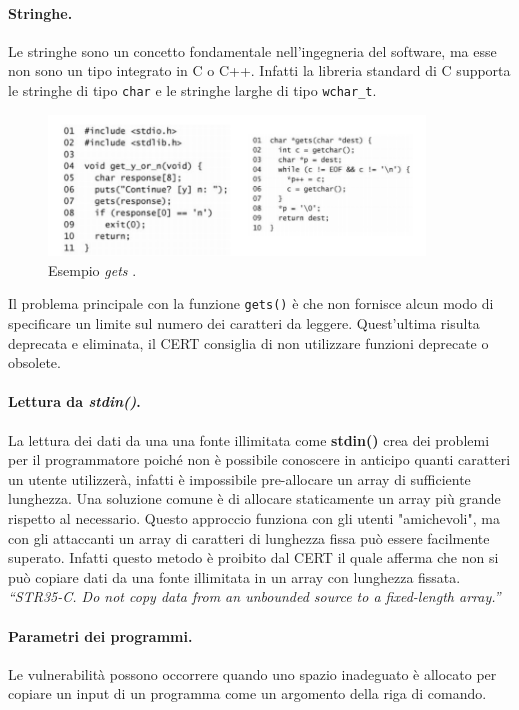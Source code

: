 \paragraph{Stringhe.}
Le stringhe sono un concetto fondamentale nell'ingegneria del software,
ma esse non sono un tipo integrato in C o C++. Infatti la libreria standard di C
supporta le stringhe di tipo \verb|char| e le stringhe larghe di tipo \verb|wchar_t|.

\begin{figure}[H]
    \centering
    \includegraphics[width=10cm, keepaspectratio]{capitoli/secure_coding/img/cap_2/gets_1.png}
    \caption{Esempio \textit{gets} .}\label{fig:gets}
\end{figure}

Il problema principale con la funzione \verb|gets()| è che non fornisce alcun modo
di specificare un limite sul numero dei caratteri da leggere.
Quest'ultima risulta deprecata e eliminata, il CERT consiglia di non utilizzare
funzioni deprecate o obsolete.

\paragraph{Lettura da \textit{stdin()}.}
La lettura dei dati da una una fonte illimitata come \textbf{stdin()} crea dei
problemi per il programmatore poiché non è possibile conoscere in anticipo quanti
caratteri un utente utilizzerà, infatti è impossibile pre-allocare un array di
sufficiente lunghezza. Una soluzione comune è di allocare staticamente un array più
grande rispetto al necessario. Questo approccio funziona con gli utenti "amichevoli",
ma con gli attaccanti un array di caratteri di lunghezza fissa può essere facilmente
superato. Infatti questo metodo è proibito dal CERT il quale afferma che non si può
copiare dati da una fonte illimitata in un array con lunghezza fissata.\\
\textit{“STR35-C. Do not copy data from an unbounded
    source to a fixed-length array.”}

\paragraph{Parametri dei programmi.}
Le vulnerabilità possono occorrere quando uno spazio inadeguato è allocato per
copiare un input di un programma come un argomento della riga di comando.

